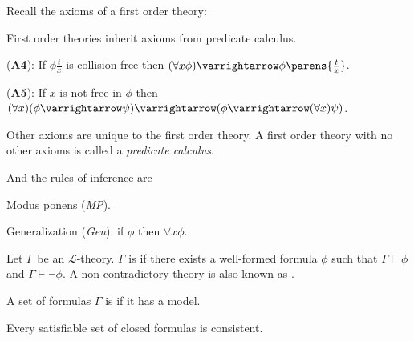 \documentclass[10pt]{article}
\let\to=\varrightarrow
\def\mL{\mathcal{L}}
\begin{document}


\bigskip

Recall the axioms of a first order theory:
\blist
    \item First order theories inherit axioms from predicate calculus.
    \item (\textbf{A4}): If $\phi\frac tx$ is collision-free then  $(\forall x\phi)\to\phi\parens{\frac tx}$.
    \item (\textbf{A5}): If $x$ is not free in $\phi$ then $(\forall x)(\phi\to\psi)\to(\phi\to(\forall x)\psi)$.
    \item Other axioms are unique to the first order theory.
        A first order theory with no other axioms is called a \emph{predicate calculus}.
\elist

And the rules of inference are
\blist
    \item Modus ponens (\textit{MP}).
    \item Generalization (\textit{Gen}): if $\phi$ then $\forall x\phi$.
\elist

\begin{defn*}

    Let $\Gamma$ be an $\mL$-theory.
    $\Gamma$ is  if there exists a well-formed formula $\phi$ such that $\Gamma\vdash\phi$ and $\Gamma\vdash\neg\phi$.
    A non-contradictory theory is also known as .

    A set of formulas $\Gamma$ is  if it has a model.

\end{defn*}

\begin{prop*}

    Every satisfiable set of closed formulas is consistent.

\end{prop*}
\end{document}
